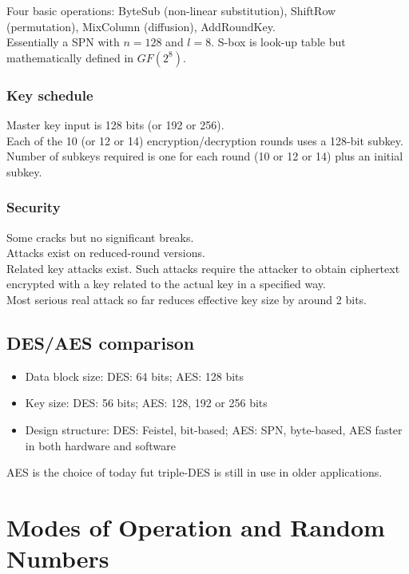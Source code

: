 \documentclass{article}
\begin{document}
Four basic operations: ByteSub (non-linear substitution), ShiftRow (permutation), MixColumn (diffusion), AddRoundKey.\\
Essentially a SPN with $n=128$ and $l=8$.
S-box is look-up table but mathematically defined in $GF(2^8)$.

\subsubsection{Key schedule}

Master key input is 128 bits (or 192 or 256).\\
Each of the 10 (or 12 or 14) encryption/decryption rounds uses a 128-bit subkey.\\
Number of subkeys required is one for each round (10 or 12 or 14) plus an initial subkey.\\

\subsubsection{Security}

Some cracks but no significant breaks.\\
Attacks exist on reduced-round versions.\\
Related key attacks exist. Such attacks require the attacker to obtain ciphertext encrypted with a key related to the actual key in a specified way.\\
Most serious real attack so far reduces effective key size by around 2 bits.

\subsection{DES/AES comparison}

\begin{itemize}
    \item Data block size: DES: 64 bits; AES: 128 bits
    \item Key size: DES: 56 bits; AES: 128, 192 or 256 bits
    \item Design structure: DES: Feistel, bit-based; AES: SPN, byte-based, AES faster in both hardware and software
\end{itemize}

AES is the choice of today fut triple-DES is still in use in older applications.


\newpage \section{Modes of Operation and Random Numbers}
\end{document}

